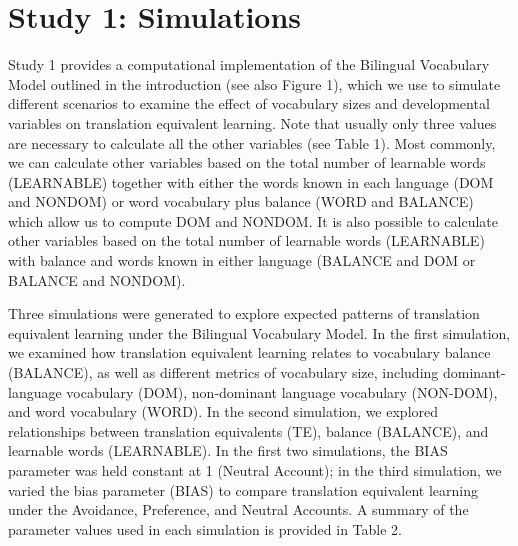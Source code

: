 \documentclass[
  english,
  ,man,floatsintext]{apa6}
\begin{document}
\hypertarget{study-1-simulations}{%
\section{Study 1: Simulations}\label{study-1-simulations}}

Study 1 provides a computational implementation of the Bilingual Vocabulary Model outlined in the introduction (see also Figure 1), which we use to simulate different scenarios to examine the effect of vocabulary sizes and developmental variables on translation equivalent learning. Note that usually only three values are necessary to calculate all the other variables (see Table 1). Most commonly, we can calculate other variables based on the total number of learnable words (LEARNABLE) together with either the words known in each language (DOM and NONDOM) or word vocabulary plus balance (WORD and BALANCE) which allow us to compute DOM and NONDOM. It is also possible to calculate other variables based on the total number of learnable words (LEARNABLE) with balance and words known in either language (BALANCE and DOM or BALANCE and NONDOM).

Three simulations were generated to explore expected patterns of translation equivalent learning under the Bilingual Vocabulary Model. In the first simulation, we examined how translation equivalent learning relates to vocabulary balance (BALANCE), as well as different metrics of vocabulary size, including dominant-language vocabulary (DOM), non-dominant language vocabulary (NON-DOM), and word vocabulary (WORD). In the second simulation, we explored relationships between translation equivalents (TE), balance (BALANCE), and learnable words (LEARNABLE). In the first two simulations, the BIAS parameter was held constant at 1 (Neutral Account); in the third simulation, we varied the bias parameter (BIAS) to compare translation equivalent learning under the Avoidance, Preference, and Neutral Accounts. A summary of the parameter values used in each simulation is provided in Table 2.
\end{document}
